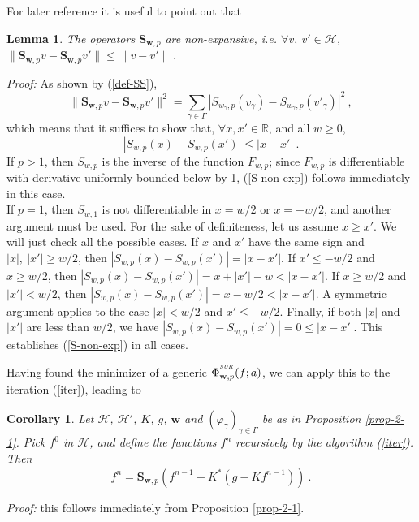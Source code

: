 \documentclass[10pt]{article}
\newtheorem{lemma}[theorem]{Lemma}
\newtheorem{corollary}[theorem]{Corollary}
\newcommand{\QED}{\hfill \raisebox{-2pt}{\rule{5.6pt}{8pt}\rule{4pt}{0pt}}%
  \smallskip\par}
\def\R{\mathbb{R}}
\def\S{\mathbf{S}}
\def\cH{\mathcal{H}}
\def\K{K^*}
\def\SUR{\mbox{\tiny{\it{SUR}}}}
\def\ag{w_{\gamma}}
\def\vpg{\varphi_{\gamma}}
\def\g{\gamma}
\newcommand\eref[1]{(\ref{#1})}
\begin{document}
For later reference it is useful to point out that
\begin{lemma}
\label{SS-non-exp}
The operators $\S_{\mathbf{w},p}$ are non-expansive, i.e.
$\forall v, ~ v' \in \cH$, $\| \S_{\mathbf{w},p} v - \S_{\mathbf{w},p} v'
\| \leq
\|v-v'\|~.$
\end{lemma}
{\em Proof:}
As shown by \eref{def-SS},
$$
\|\S_{\mathbf{w},p} v - \S_{\mathbf{w},p} v' \|^2 =
\sum_{\g \in \Gamma} |S_{\ag,p}( v_{\g}) - S_{\ag,p}( v'_{\g})|^2 ~,
$$
which means that it suffices to show that, $\forall x , x' \in \R$, and all
$w\geq0$,
\begin{equation}
\label{S-non-exp}
| S_{w,p}(x)-S_{w,p}(x')| \leq |x-x'|~.
\end{equation}
If $p >1$, then $S_{w,p}$ is the inverse of the function $F_{w,p}$; since
$F_{w,p}$ is differentiable with derivative uniformly bounded below by 1,
\eref{S-non-exp} follows immediately in this case.\\
If $p=1$, then $S_{w,1}$ is not differentiable in $x=w/2$ or $x=-w/2$, and
another
argument must be used. For the sake of definiteness, let us assume $x \geq x'$.
We will just check all the possible cases.
If $x$ and $x'$ have the same sign and $|x|,~|x'|\geq w/2$, then
$| S_{w,p}(x)-S_{w,p}(x')| =|x-x'|$. If $x'\leq -w/2$ and $x \geq w/2$, then
$| S_{w,p}(x)-S_{w,p}(x')| = x +|x'|-w < |x-x'|$. If
$x \geq w/2$ and $|x'| < w/2$, then
$| S_{w,p}(x)-S_{w,p}(x')| =x-w/2 < |x-x'|$. A symmetric argument applies
to the
case $|x|<w/2$ and $x' \leq -w/2$. Finally, if both $|x|$ and $|x'|$ are
less than
$w/2$, we have
$| S_{w,p}(x)-S_{w,p}(x')|=0 \leq |x-x'|$. This establishes \eref{S-non-exp}
in all cases. \hfill \QED

\bigskip

Having found the minimizer of a generic
${\Phi}^{^{\SUR}}_{\mathbf{w},p}(f ; a)$, we can
apply this to the
iteration \eref{iter}, leading to

\begin{corollary}
\label{cor-2-2}
Let $\cH$, $\cH'$, $K$, $g$, $\mathbf{w}$ and $(\vpg)_{\g \in \Gamma}$ be
as in Proposition {\rm \ref{prop-2-1}}. Pick $f^0$ in $\cH$, and define
the functions $f^n$ recursively by the algorithm {\rm \eref{iter}}.
Then
\begin{equation}
\label{f-n}
f^n= \S_{\mathbf{w},p}\left(f^{n-1}+ \K (g-Kf^{n-1}) \right) ~.
\end{equation}
\end{corollary}
{\em Proof:} this follows immediately from Proposition \ref{prop-2-1}.
$~~~~~~~~~~~$ \hfill \QED
\end{document}
